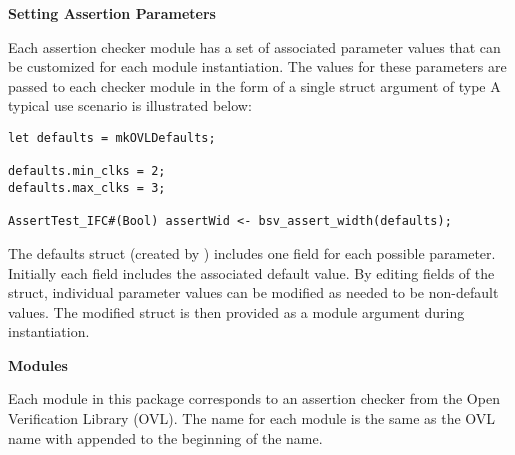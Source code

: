 {\bf Setting Assertion Parameters}

Each assertion checker module has a set of associated parameter values
that can be customized for each module instantiation. The values for
these parameters are passed to each checker module in the form of a
single struct argument of type   A typical use scenario
is illustrated below: 

\begin{verbatim}
let defaults = mkOVLDefaults;

defaults.min_clks = 2;
defaults.max_clks = 3;

AssertTest_IFC#(Bool) assertWid <- bsv_assert_width(defaults);
\end{verbatim}

The defaults struct (created by ) includes one field for
each possible parameter. Initially each field includes the associated
default value. By editing fields of the struct,  individual parameter
values can be modified as needed to be non-default values.  The
modified  struct is then  provided as a module argument during
instantiation. 



   


{\bf Modules}

Each module in this package corresponds to an assertion checker from the Open
Verification Library (OVL).  The {\BSV} name for each module is the same as the OVL name
with  appended to the beginning of the  name.


